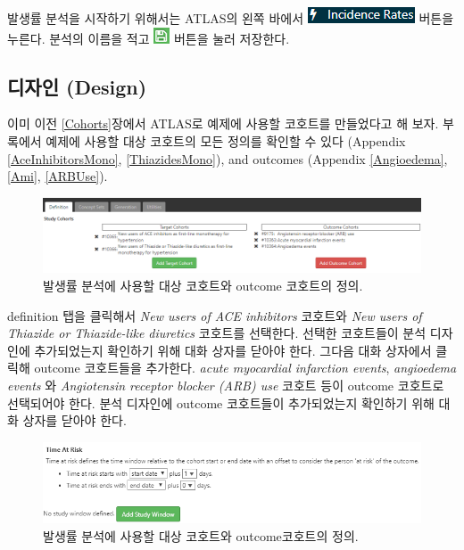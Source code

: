 \documentclass[11pt]{book}
\theoremstyle{definition}
\theoremstyle{definition}
\theoremstyle{definition}
\theoremstyle{remark}
\begin{document}
발생률 분석을 시작하기 위해서는 ATLAS의 왼쪽 바에서
\includegraphics{images/Characterization/atlasIncidenceMenuItem.png}
버튼을 누른다. 분석의 이름을 적고
\includegraphics{images/PopulationLevelEstimation/save.png} 버튼을 눌러
저장한다.

\subsection{디자인 (Design)}\label{-design-2}

이미 이전 \ref{Cohorts}장에서 ATLAS로 예제에 사용할 코호트를 만들었다고
해 보자. 부록에서 예제에 사용할 대상 코호트의 모든 정의를 확인할 수 있다
(Appendix \ref{AceInhibitorsMono}, \ref{ThiazidesMono}), and outcomes
(Appendix \ref{Angioedema}, \ref{Ami}, \ref{ARBUse}).

\begin{figure}

{\centering \includegraphics[width=1\linewidth]{images/Characterization/atlasIncidenceCohortSelection} 

}

\caption{발생률 분석에 사용할 대상 코호트와 outcome 코호트의 정의.}\label{fig:atlasIncidenceCohortSelection}
\end{figure}

definition 탭을 클릭해서 \emph{New users of ACE inhibitors} 코호트와
\emph{New users of Thiazide or Thiazide-like diuretics} 코호트를
선택한다. 선택한 코호트들이 분석 디자인에 추가되었는지 확인하기 위해
대화 상자를 닫아야 한다. 그다음 대화 상자에서 클릭해 outcome 코호트들을
추가한다. \emph{acute myocardial infarction events}, \emph{angioedema
events} 와 \emph{Angiotensin receptor blocker (ARB) use} 코호트 등이
outcome 코호트로 선택되어야 한다. 분석 디자인에 outcome 코호트들이
추가되었는지 확인하기 위해 대화 상자를 닫아야 한다.

\begin{figure}

{\centering \includegraphics[width=1\linewidth]{images/Characterization/atlasIncidenceTimeAtRisk} 

}

\caption{발생률 분석에 사용할 대상 코호트와 outcome코호트의 정의.}\label{fig:atlasIncidenceTimeAtRisk}
\end{figure}
\end{document}
